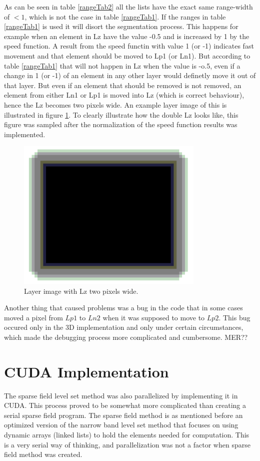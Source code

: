 As can be seen in table \ref{rangeTab2} all the lists have the exact same range-width of $<1$, which is not the case in table \ref{rangeTab1}. If the ranges in table \ref{rangeTab1} is used it will disort the segmentation process. This happens for example when an element in Lz have the value -0.5 and is increased by 1 by the speed function. A result from the speed functin with value 1 (or -1) indicates fast movement and that element should be moved to Lp1 (or Ln1). But according to table \ref{rangeTab1} that will not happen in Lz when the value is -o.5, even if a change in 1 (or -1) of an element in any other layer would definetly move it out of that layer. But even if an element that should be removed is not removed, an element from either Ln1 or Lp1 is moved into Lz (which is correct behaviour), hence the Lz becomes two pixels wide. An example layer image of this is illustrated in figure \ref{doubleLzLayer}. To clearly illustrate how the double Lz looks like, this figure was sampled after the normalization of the speed function results was implemented.
\begin{figure}[h!]
\centering
\includegraphics[width=0.80\textwidth]{implemented/doubleLzLayer}
\caption{Layer image with Lz two pixels wide.}
\label{doubleLzLayer}
\end{figure}

Another thing that caused problems was a bug in the code that in some cases moved a pixel from $Lp1$ to $Ln2$ when it was supposed to move to $Lp2$. This bug occured only in the 3D implementation and only under certain circumstances, which made the debugging process more complicated and cumbersome. MER??

\section{CUDA Implementation}
The sparse field level set method was also parallelized by implementing it in CUDA. This process proved to be somewhat more complicated than creating a serial sparse field program. The sparse field method is as mentioned before an optimized version of the narrow band level set method that focuses on using dynamic arrays (linked lists) to hold the elements needed for computation. This is a very serial way of thinking, and parallelization was not a factor when sparse field method was created. 


